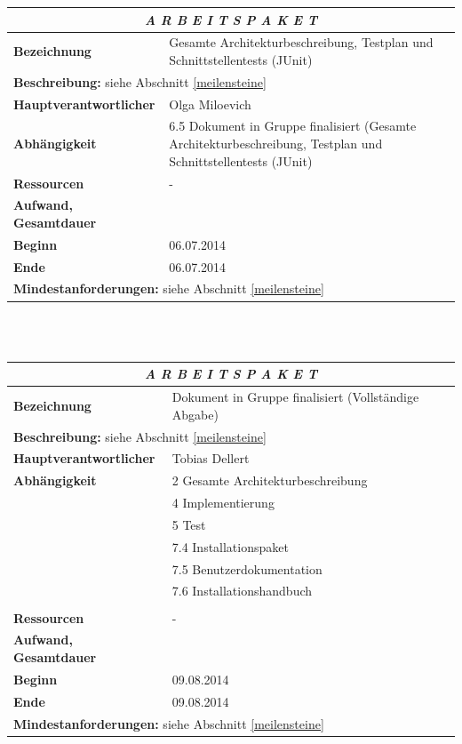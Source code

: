 \documentclass[fontsize=12pt,paper=a4,twoside]{scrartcl}
\begin{document}
\begin{tabular}{p{7.5cm}|p{7.5cm}}\toprule
\multicolumn{2}{c}{\textbf{\textit{A R B E I T S P A K E T \quad 5.6}}} \\ \toprule \hline
\textbf{Bezeichnung} & Gesamte Architekturbeschreibung, Testplan und Schnittstellentests (JUnit)\\\hline
\multicolumn{2}{p{15cm}}{\textbf{Beschreibung:} \newline 
siehe Abschnitt \ref{meilensteine} }  \\\hline
\textbf{Hauptverantwortlicher} & Olga Miloevich \\\hline
\textbf{Abhängigkeit} & 6.5 Dokument in Gruppe finalisiert (Gesamte Architekturbeschreibung, Testplan und Schnittstellentests (JUnit)\\\hline
\textbf{Ressourcen} & -\\\hline
\textbf{Aufwand, Gesamtdauer} & \\\hline
\textbf{Beginn} & 06.07.2014 \\\hline
\textbf{Ende} & 06.07.2014\\\hline
\multicolumn{2}{p{15cm}}{\textbf{Mindestanforderungen: } \newline
siehe Abschnitt \ref{meilensteine}}  \\ \toprule
\end{tabular} \\\\

\begin{tabular}{p{7.5cm}|p{7.5cm}}\toprule
\multicolumn{2}{c}{\textbf{\textit{A R B E I T S P A K E T \quad 5.7}}} \\ \toprule \hline
\textbf{Bezeichnung} & Dokument in Gruppe finalisiert (Vollständige Abgabe)\\\hline
\multicolumn{2}{p{15cm}}{\textbf{Beschreibung:} \newline 
siehe Abschnitt \ref{meilensteine} }  \\\hline
\textbf{Hauptverantwortlicher} & Tobias Dellert \\\hline
\textbf{Abhängigkeit} & 2 Gesamte Architekturbeschreibung \\
& 4 Implementierung \\
& 5 Test \\
& 7.4 Installationspaket \\
& 7.5 Benutzerdokumentation \\
& 7.6 Installationshandbuch \\
\\\hline
\textbf{Ressourcen} & -\\\hline
\textbf{Aufwand, Gesamtdauer} & \\\hline
\textbf{Beginn} & 09.08.2014 \\\hline
\textbf{Ende} & 09.08.2014\\\hline
\multicolumn{2}{p{15cm}}{\textbf{Mindestanforderungen: } \newline
siehe Abschnitt \ref{meilensteine}}  \\ \toprule
\end{tabular} \\\\
\end{document}

